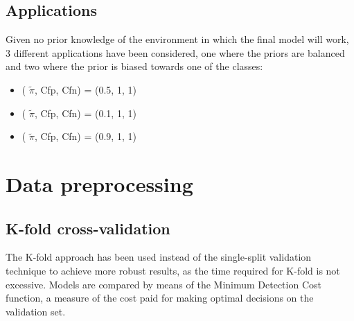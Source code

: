\documentclass[12pt,a4paper]{article}
\begin{document}
\clearpage

\subsection{Applications}

Given no prior knowledge of the environment in which the final model will work,
3 different applications have been considered, one where the priors are balanced and two where the prior is biased towards one of the classes:
\begin{itemize}
    \item ( \(\tilde{\pi}\), Cfp, Cfn) = (0.5, 1, 1)
    \item ( \(\tilde{\pi}\), Cfp, Cfn) = (0.1, 1, 1)
    \item ( \(\tilde{\pi}\), Cfp, Cfn) = (0.9, 1, 1)
\end{itemize}

\section{Data preprocessing}

\subsection{K-fold cross-validation}

The K-fold approach has been used instead of the single-split validation technique to achieve more robust results, as the time required for K-fold is not excessive.
Models are compared by means of the Minimum Detection Cost function, a measure of the cost paid for making optimal decisions on the validation set. \\
\end{document}
